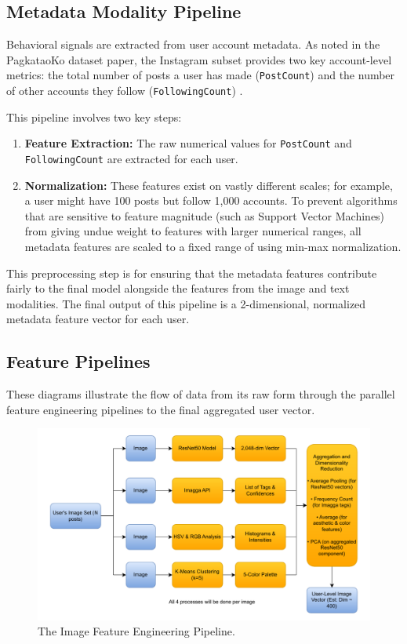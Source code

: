 \subsection{Metadata Modality Pipeline}
Behavioral signals are extracted from user account metadata. As noted in the PagkataoKo dataset paper, the Instagram subset provides two key account-level metrics: the total number of posts a user has made (\texttt{PostCount}) and the number of other accounts they follow (\texttt{FollowingCount}) \citep{tighe_acorda_2022}.

This pipeline involves two key steps:
\begin{enumerate}
	\item \textbf{Feature Extraction:} The raw numerical values for \texttt{PostCount} and \texttt{FollowingCount} are extracted for each user.
	\item \textbf{Normalization:} These features exist on vastly different scales; for example, a user might have 100 posts but follow 1,000 accounts. To prevent algorithms that are sensitive to feature magnitude (such as Support Vector Machines) from giving undue weight to features with larger numerical ranges, all metadata features are scaled to a fixed range of  using min-max normalization.
\end{enumerate}
This preprocessing step is for ensuring that the metadata features contribute fairly to the final model alongside the features from the image and text modalities. The final output of this pipeline is a 2-dimensional, normalized metadata feature vector for each user.

\subsection{Feature Pipelines}
These diagrams illustrate the flow of data from its raw form through the parallel feature engineering pipelines to the final aggregated user vector. 
\begin{figure}[H]
	\centering
	\includegraphics[width=\textwidth]{"figures/Image-Pipeline-Diagram.pdf"}
	\caption{The Image Feature Engineering Pipeline. }
	\label{fig:image_pipeline_diagram}
\end{figure}

